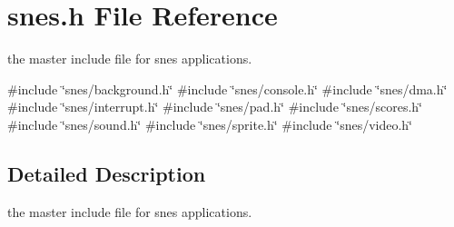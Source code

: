 \hypertarget{a00356}{}\section{snes.\+h File Reference}
\label{a00356}


the master include file for snes applications.  


{\ttfamily \#include \char`\"{}snes/background.\+h\char`\"{}}\newline
{\ttfamily \#include \char`\"{}snes/console.\+h\char`\"{}}\newline
{\ttfamily \#include \char`\"{}snes/dma.\+h\char`\"{}}\newline
{\ttfamily \#include \char`\"{}snes/interrupt.\+h\char`\"{}}\newline
{\ttfamily \#include \char`\"{}snes/pad.\+h\char`\"{}}\newline
{\ttfamily \#include \char`\"{}snes/scores.\+h\char`\"{}}\newline
{\ttfamily \#include \char`\"{}snes/sound.\+h\char`\"{}}\newline
{\ttfamily \#include \char`\"{}snes/sprite.\+h\char`\"{}}\newline
{\ttfamily \#include \char`\"{}snes/video.\+h\char`\"{}}\newline


\subsection{Detailed Description}
the master include file for snes applications. 

